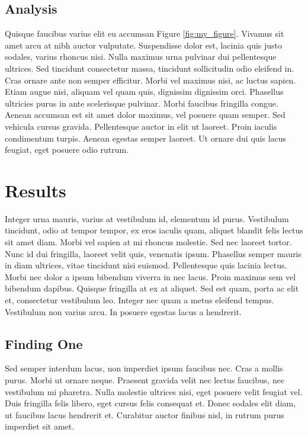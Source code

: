 \documentclass[11pt,letterpaper]{article} %
\begin{document}
	\subsection*{Analysis}
	Quisque faucibus varius elit eu accumsan Figure \ref{fig:my_figure}. Vivamus sit amet arcu at nibh auctor vulputate. Suspendisse dolor est, lacinia quis justo sodales, varius rhoncus nisi. Nulla maximus urna pulvinar dui pellentesque ultrices. Sed tincidunt consectetur massa, tincidunt sollicitudin odio eleifend in. Cras ornare ante non semper efficitur. Morbi vel maximus nisi, ac luctus sapien. Etiam augue nisi, aliquam vel quam quis, dignissim dignissim orci. Phasellus ultricies purus in ante scelerisque pulvinar. Morbi faucibus fringilla congue. Aenean accumsan est sit amet dolor maximus, vel posuere quam semper. Sed vehicula cursus gravida. Pellentesque auctor in elit ut laoreet. Proin iaculis condimentum turpis. Aenean egestas semper laoreet. Ut ornare dui quis lacus feugiat, eget posuere odio rutrum.
	
	\section*{Results}
	
	Integer urna mauris, varius at vestibulum id, elementum id purus. Vestibulum tincidunt, odio at tempor tempor, ex eros iaculis quam, aliquet blandit felis lectus sit amet diam. Morbi vel sapien at mi rhoncus molestie. Sed nec laoreet tortor. Nunc id dui fringilla, laoreet velit quis, venenatis ipsum. Phasellus semper mauris in diam ultrices, vitae tincidunt nisi euismod. Pellentesque quis lacinia lectus. Morbi nec dolor a ipsum bibendum viverra in nec lacus. Proin maximus sem vel bibendum dapibus. Quisque fringilla at ex at aliquet. Sed est quam, porta ac elit et, consectetur vestibulum leo. Integer nec quam a metus eleifend tempus. Vestibulum non varius arcu. In posuere egestas lacus a hendrerit.
	
	\subsection*{Finding One}
	
	Sed semper interdum lacus, non imperdiet ipsum faucibus nec. Cras a mollis purus. Morbi ut ornare neque. Praesent gravida velit nec lectus faucibus, nec vestibulum mi pharetra. Nulla molestie ultrices nisi, eget posuere velit feugiat vel. Duis fringilla felis libero, eget cursus felis consequat et. Donec sodales elit diam, ut faucibus lacus hendrerit et. Curabitur auctor finibus nisl, in rutrum purus imperdiet sit amet.
\end{document}
